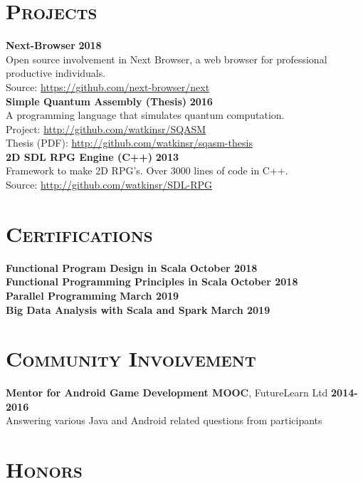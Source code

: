 \documentclass[line, margin, 10pt]{res}
\begin{document}
\begin{resume}
\newpage
\section{\textsc{Projects}}

{\bf Next-Browser} {\bf \hfill 2018}\\
Open source involvement in Next Browser, a web browser for professional productive individuals.\\
Source: \url{https://github.com/next-browser/next}\\

{\bf Simple Quantum Assembly (Thesis)} {\bf \hfill 2016}\\
A programming language that simulates quantum computation.\\
Project: \url{http://github.com/watkinsr/SQASM}\\
Thesis (PDF): \url{http://github.com/watkinsr/sqasm-thesis}\\

{\bf 2D SDL RPG Engine (C++)} {\bf \hfill 2013}\\
Framework to make 2D RPG's. Over 3000 lines of code in C++.  \\
Source: \url{http://github.com/watkinsr/SDL-RPG}

\section{\textsc{Certifications}}
{\bf Functional Program Design in Scala} {\bf \hfill October 2018}\\
{\bf Functional Programming Principles in Scala} {\bf \hfill October 2018}\\
{\bf Parallel Programming} {\bf \hfill March 2019}\\
{\bf Big Data Analysis with Scala and Spark} {\bf \hfill March 2019}\\

\section{\textsc{Community Involvement}}

{\bf Mentor for Android Game Development MOOC}, FutureLearn Ltd {\bf \hfill 2014-2016}\\
Answering various Java and Android related questions from participants

\section{\textsc{Honors}}


\end{resume}
\end{document}
